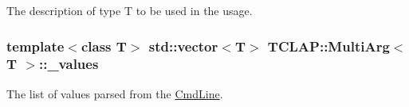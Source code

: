 The description of type T to be used in the usage. \hypertarget{class_t_c_l_a_p_1_1_multi_arg_aabcab153e09608343713a6ffef431783}{
\subsubsection[{\+\_\+values}]{\setlength{\rightskip}{0pt plus 5cm}template$<$class T$>$ std\+::vector$<$T$>$ {\bf T\+C\+L\+A\+P\+::\+Multi\+Arg}$<$ T $>$\+::\+\_\+values\hspace{0.3cm}{\ttfamily [protected]}}}\label{class_t_c_l_a_p_1_1_multi_arg_aabcab153e09608343713a6ffef431783}
The list of values parsed from the \hyperlink{class_t_c_l_a_p_1_1_cmd_line}{Cmd\+Line}. 